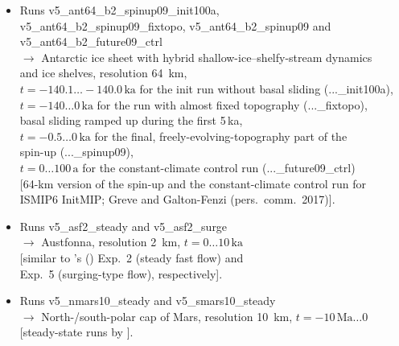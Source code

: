 \documentclass[12pt,a4paper]{article}
\begin{document}
\begin{itemize}
\begin{itemize}
\item
Runs v5\_ant64\_b2\_spinup09\_init100a,
\\
\phantom{Runs} v5\_ant64\_b2\_spinup09\_fixtopo, v5\_ant64\_b2\_spinup09 and
\\
\phantom{Runs} v5\_ant64\_b2\_future09\_ctrl
\\
$\longrightarrow$ Antarctic ice sheet with hybrid shallow-ice--shelfy-stream dynamics
\\
\phantom{$\longrightarrow$} \citep{bernales_etal_2017} and ice shelves, resolution 64~km,
\\
\phantom{$\longrightarrow$} $t=-140.1\ldots{}-140.0\,\mathrm{ka}$ for the init run without basal sliding (...\_init100a),
\\
\phantom{$\longrightarrow$} $t=-140\ldots{}0\,\mathrm{ka}$ for the run with almost fixed topography (...\_fixtopo),
\\
\hspace*{9.15em} basal sliding ramped up during the first 5\,ka,
\\
\phantom{$\longrightarrow$} $t=-0.5\ldots{}0\,\mathrm{ka}$ for the final, freely-evolving-topography part of the
\\
\hspace*{9.0em} spin-up (...\_spinup09),
\\
\phantom{$\longrightarrow$} $t=0\ldots{}100\,\mathrm{a}$ for the constant-climate control run (...\_future09\_ctrl)
\\{}
\phantom{$\longrightarrow$} [64-km version of the spin-up and the constant-climate control run for 
\\
\phantom{$\longrightarrow$} ISMIP6 InitMIP; Greve and Galton-Fenzi (pers.\ comm.\ 2017)].

\item
Runs v5\_asf2\_steady and v5\_asf2\_surge
\\
$\longrightarrow$ Austfonna, resolution 2~km, $t=0\ldots{}10\,\mathrm{ka}$
\\
\phantom{$\longrightarrow$} [similar to \citeauthor{dunse_etal_2011}'s (\citeyear{dunse_etal_2011}) Exp.~2 (steady fast flow) and
\\
\phantom{$\longrightarrow$} Exp.~5 (surging-type flow), respectively].

\item
Runs v5\_nmars10\_steady and v5\_smars10\_steady
\\
$\longrightarrow$ North-/south-polar cap of Mars, resolution 10~km, $t=-10\,\mathrm{Ma}\ldots{}0$
\\
\phantom{$\longrightarrow$} [steady-state runs by \citet{greve_2007b}].


\end{itemize}
\end{itemize}
\end{document}
